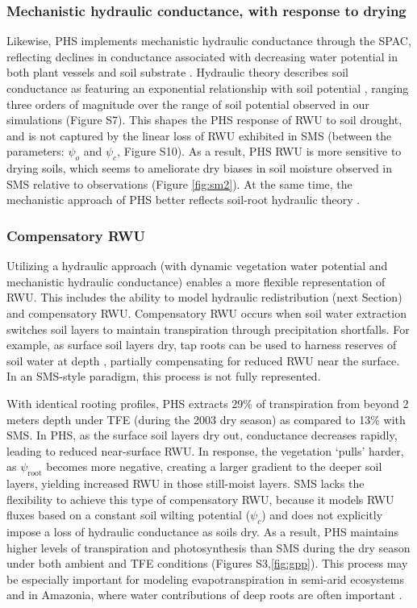 \documentclass[draft,linenumbers]{agujournal}
\begin{document}
\subsubsection{Mechanistic hydraulic conductance, with response to drying}
Likewise, PHS implements mechanistic hydraulic conductance through the SPAC, reflecting declines in conductance associated with decreasing water potential in both plant vessels and soil substrate \citep{tyree1989}.
Hydraulic theory describes soil conductance as featuring an exponential relationship with soil potential \citep{brooks1964}, ranging three orders of magnitude over the range of soil potential observed in our simulations (Figure S7).
This shapes the PHS response of RWU to soil drought, and is not captured by the linear loss of RWU exhibited in SMS (between the parameters: $\psi_o$ and $\psi_c$, Figure S10).
As a result, PHS RWU is more sensitive to drying soils, which seems to ameliorate dry biases in soil moisture observed in SMS relative to observations (Figure \ref{fig:sm2}).
At the same time, the mechanistic approach of PHS better reflects soil-root hydraulic theory \citep{cai2018,warren2015}.

\subsubsection{Compensatory RWU}
Utilizing a hydraulic approach (with dynamic vegetation water potential and mechanistic hydraulic conductance) enables a more flexible representation of RWU.
This includes the ability to model hydraulic redistribution (next Section) and compensatory RWU.
Compensatory RWU occurs when soil water extraction switches soil layers to maintain transpiration through precipitation shortfalls.
For example, as surface soil layers dry, tap roots can be used to harness reserves of soil water at depth \citep{oliveira2005}, partially compensating for reduced RWU near the surface.
In an SMS-style paradigm, this process is not fully represented.

With identical rooting profiles, PHS extracts 29\% of transpiration from beyond 2 meters depth under TFE (during the 2003 dry season) as compared to 13\% with SMS.
In PHS, as the surface soil layers dry out, conductance decreases rapidly, leading to reduced near-surface RWU.
In response, the vegetation `pulls' harder, as $\psi_{\text{root}}$ becomes more negative, creating a larger gradient to the deeper soil layers, yielding increased RWU in those still-moist layers.
SMS lacks the flexibility to achieve this type of compensatory RWU, because it models RWU fluxes based on a constant soil wilting potential ($\psi_c$) and does not explicitly impose a loss of hydraulic conductance as soils dry.
As a result, PHS maintains higher levels of transpiration and photosynthesis than SMS during the dry season under both ambient and TFE conditions (Figures S3,\ref{fig:gpp}).
This process may be especially important for modeling evapotranspiration in semi-arid ecosystems \citep{jarvis2011} and in Amazonia, where water contributions of deep roots are often important \citep{nepstad1994}.
\end{document}
